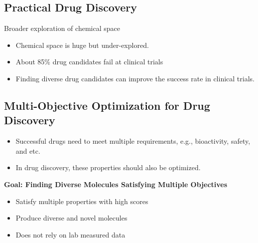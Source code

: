 \documentclass[10pt]{article}
\begin{document}
\subsection*{Practical Drug Discovery}
Broader exploration of chemical space
\begin{itemize}
	\item Chemical space is huge but under-explored.
	\item About 85\% drug candidates fail at clinical trials
	\item Finding diverse drug candidates can improve the success rate in clinical trials.
\end{itemize}

\subsection*{Multi-Objective Optimization for Drug Discovery}
\begin{itemize}
	\item Successful drugs need to meet multiple requirements, e.g., bioactivity, safety, and etc.
	\item In drug discovery, these properties should also be optimized.
\end{itemize}
\textbf{Goal: Finding Diverse Molecules Satisfying Multiple Objectives}
\begin{itemize}
	\item Satisfy multiple properties with high scores
	\item Produce diverse and novel molecules
	\item Does not rely on lab measured data
\end{itemize}
\end{document}
